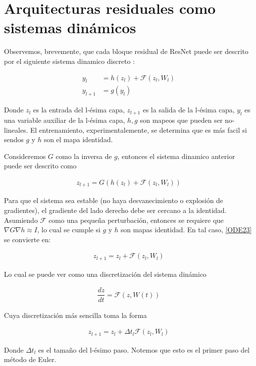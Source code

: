 \documentclass[titlepage,a4paper,oneside]{article}
\begin{document}
\section{Arquitecturas residuales como sistemas dinámicos}
Observemos, brevemente, que cada bloque residual de ResNet puede ser descrito por el siguiente sistema dinamico discreto \cite{E-2017}:

\begin{align}\label{ODE_ResNet}
	    y_l &= h(z_l) + \mathscr{F}(z_l, W_l)\\
	y_{l+1} &= g(y_l)
\end{align}

Donde $z_l$ es la entrada del l-ésima capa, $z_{l+1}$ es la salida de la l-ésima capa, $y_l$ es una variable auxiliar de la l-ésima capa, $h, g$ son mapeos que pueden ser no-lineales. El entrenamiento, experimentalemente, se determina \cite{he2016identity} que es más facil si sendos $g$ y $h$ son el mapa identidad.

Consideremos $G$ como la inversa de $g$, entonces el sistema dinamico anterior puede ser descrito como

\begin{align}\label{ODE23}
	z_{l+1} = G(h(z_l) + \mathscr{F}(z_l, W_l))
\end{align}

Para que el sistema sea estable (no haya desvanecimiento o explosión de gradientes), el gradiente del lado derecho debe ser cercano a la identidad. Asumiendo $\mathscr{F}$ como una pequeña perturbación, entonces se requiere que $\nabla G \nabla h \approx I$, lo cual se cumple si $g$ y $h$ son mapas identidad. En tal caso, \ref{ODE23} se convierte en:

\begin{align}
	z_{l+1} = z_l + \mathscr{F}(z_l, W_l)
\end{align}

Lo cual se puede ver como una discretización del sistema dinámico

\begin{align}
	\dfrac{dz}{dt} = \mathscr{F}(z, W(t))
\end{align}

Cuya discretización más sencilla toma la forma

\begin{align}
	z_{l+1} = z_l + \Delta t_l \mathscr{F}(z_l, W_l)
\end{align}

Donde $\Delta t_l$ es el tamaño del l-ésimo paso. Notemos que esto es el primer paso del método de Euler.
\end{document}
